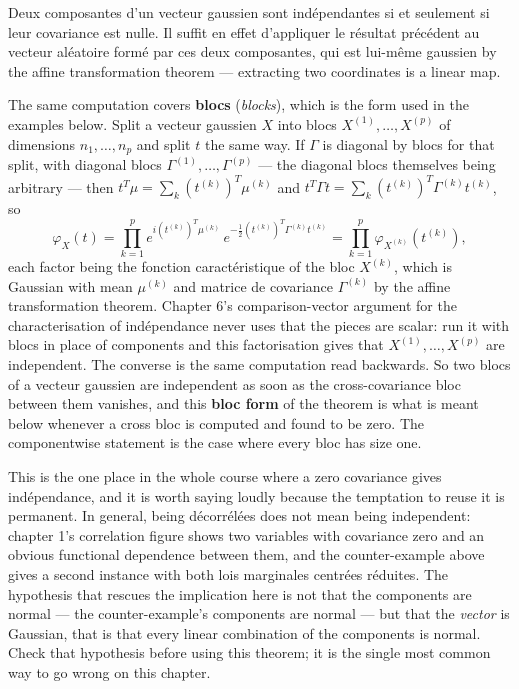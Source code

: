 \begin{remark}
Deux composantes d'un vecteur gaussien sont indépendantes si et seulement si leur
covariance est nulle. Il suffit en effet d'appliquer le résultat précédent au
vecteur aléatoire formé par ces deux composantes, qui est lui-même gaussien by
the affine transformation theorem --- extracting two coordinates is a linear map.
\end{remark}

\begin{remark}
The same computation covers \textbf{blocs} (\textit{blocks}), which is the form
used in the examples below. Split a vecteur gaussien $X$ into blocs
$X^{(1)},\dots,X^{(p)}$ of dimensions $n_{1},\dots,n_{p}$ and split $t$ the same
way. If $\Gamma$ is diagonal by blocs for that split, with diagonal blocs
$\Gamma^{(1)},\dots,\Gamma^{(p)}$ --- the diagonal blocs themselves being
arbitrary --- then
$t^{T}\mu = \sum_{k}(t^{(k)})^{T}\mu^{(k)}$ and
$t^{T}\Gamma t = \sum_{k}(t^{(k)})^{T}\Gamma^{(k)}t^{(k)}$, so
\[
  \varphi_{X}(t) = \prod_{k=1}^{p}
    e^{i(t^{(k)})^{T}\mu^{(k)}}\,
    e^{-\frac{1}{2}(t^{(k)})^{T}\Gamma^{(k)}t^{(k)}}
  = \prod_{k=1}^{p} \varphi_{X^{(k)}}\!\left(t^{(k)}\right) ,
\]
each factor being the fonction caractéristique of the bloc $X^{(k)}$, which is
Gaussian with mean $\mu^{(k)}$ and matrice de covariance $\Gamma^{(k)}$ by the
affine transformation theorem. Chapter 6's comparison-vector argument for the
characterisation of indépendance never uses that the pieces are scalar: run it
with blocs in place of components and this factorisation gives that
$X^{(1)},\dots,X^{(p)}$ are independent. The converse is the same computation
read backwards. So two blocs of a vecteur gaussien are independent as soon as the
cross-covariance bloc between them vanishes, and this \textbf{bloc form} of the
theorem is what is meant below whenever a cross bloc is computed and found to be
zero. The componentwise statement is the case where every bloc has size one.
\end{remark}

\begin{remark}
This is the one place in the whole course where a zero covariance gives
indépendance, and it is worth saying loudly because the temptation to reuse it is
permanent. In general, being décorrélées does not mean being independent:
chapter 1's correlation figure shows two variables with covariance zero and an
obvious functional dependence between them, and the counter-example above gives a
second instance
with both lois marginales centrées réduites. The hypothesis that rescues the
implication here is not that the components are normal --- the counter-example's
components are normal --- but that the \emph{vector} is Gaussian, that is that
every linear combination of the components is normal. Check that hypothesis
before using this theorem; it is the single most common way to go wrong on this
chapter.
\end{remark}

